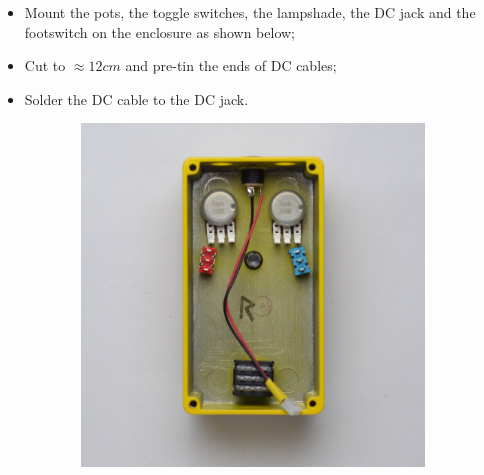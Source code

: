 \documentclass[a4paper,12pt]{article}
\begin{document}
\begin{itemize}
  \item Mount the pots, the toggle switches, the lampshade,
    the DC jack and the footswitch on the enclosure as
    shown below;
  \item Cut to $\approx12cm$ and pre-tin the ends of DC cables;
  \item Solder the DC cable to the DC jack.
\end{itemize}


\begin{figure}[h!]
  \centering
  \begin{subfigure}[b]{0.49\textwidth}
    \centering
    \includegraphics[width=\textwidth]{build/09-enclosure-mount-inside-1000px.jpg}
  \end{subfigure}
  \begin{subfigure}[b]{0.49\textwidth}
    \centering

\end{subfigure}
\end{figure}
\end{document}
